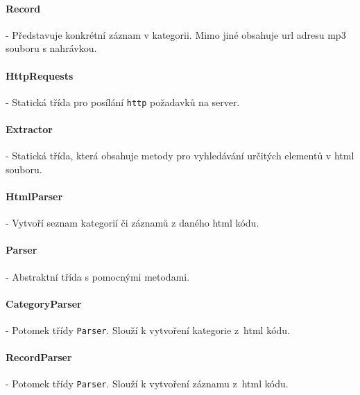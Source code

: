 \documentclass[12pt,a4paper,titlepage]{article}
\begin{document}
	\paragraph{Record}
	- Představuje konkrétní záznam v kategorii. Mimo jiné obsahuje url adresu mp3 souboru s nahrávkou.
	
	\paragraph{HttpRequests}
	- Statická třída pro posílání \texttt{http} požadavků na server.	
	
	\paragraph{Extractor}
	- Statická třída, která obsahuje metody pro vyhledávání určitých elementů v html souboru.
	
	\paragraph{HtmlParser}
	- Vytvoří seznam kategorií či záznamů z daného html kódu.

	\paragraph{Parser}
	- Abstraktní třída s pomocnými  metodami.

	\paragraph{CategoryParser}
	- Potomek třídy \texttt{Parser}. Slouží k vytvoření kategorie z~html kódu.

	\paragraph{RecordParser}
	- Potomek třídy \texttt{Parser}. Slouží k vytvoření záznamu z~html kódu.
\end{document}
